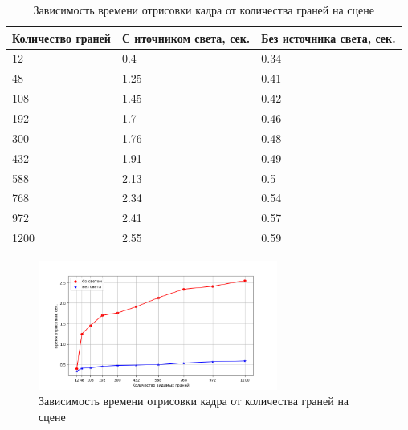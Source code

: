 \begin{table}[h]
 \begin{center}
  \begin{threeparttable}
  \captionsetup{justification=raggedright,singlelinecheck=off}
  \caption{Зависимость времени отрисовки кадра от количества граней на сцене}
  \label{tbl:log1}
                    \begin{tabular}{|l|l|l|}
                        \hline
                        Количество граней & С иточником света, сек. & Без источника света, сек.\\
                        \hline
                            12 & 0.4 & 0.34 \\ \hline
                            48 & 1.25 & 0.41 \\ \hline
                            108 & 1.45 & 0.42 \\ \hline
                            192 & 1.7 & 0.46 \\ \hline
                            300 & 1.76 & 0.48 \\ \hline
                            432 & 1.91 & 0.49 \\ \hline
                            588 & 2.13 & 0.5 \\ \hline
                            768 & 2.34 & 0.54 \\ \hline
                            972 & 2.41 & 0.57 \\ \hline
                            1200 & 2.55 & 0.59 \\ \hline
                    \end{tabular}
  \end{threeparttable}
    \end{center}
\end{table}

\begin{figure}[htpb]
    \centering
    \includegraphics[width=0.7\textwidth]{inc/img/research}
    \caption{Зависимость времени отрисовки кадра от количества граней на сцене}
    \label{fig:inc-img-science}
\end{figure}

